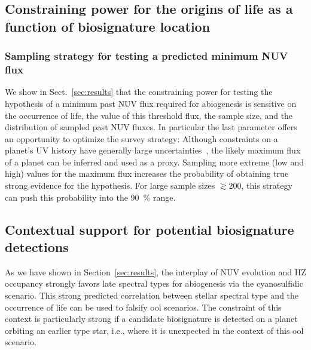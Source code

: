 \documentclass[modern,linenumbers]{aastex631}
\begin{document}
\subsection{Constraining power for the origins of life as a function of biosignature location}
\subsubsection{Sampling strategy for testing a predicted minimum \gls{NUV} flux}
We show in Sect.~\ref{sec:results} that the constraining power for testing the hypothesis of a minimum past \gls{NUV} flux required for abiogenesis is sensitive on the occurrence of life, the value of this threshold flux, the sample size, and the distribution of sampled past \gls{NUV} fluxes.
In particular the last parameter offers an opportunity to optimize the survey strategy: Although constraints on a planet's UV history have generally large uncertainties~\citep[e.g.,][]{Richey-Yowell2023}, the likely maximum flux of a planet can be inferred and used as a proxy.
Sampling more extreme (low and high) values for the maximum flux increases the probability of obtaining true strong evidence for the hypothesis.
For large sample sizes $\gtrsim 200$, this strategy can push this probability into the \SI{90}{\percent} range.




\subsection{Contextual support for potential biosignature detections}
As we have shown in Section~\ref{sec:results}, the interplay of \gls{NUV} evolution and \gls{HZ} occupancy strongly favors late spectral types for abiogenesis via the cyanosulfidic scenario.
This strong predicted correlation between stellar spectral type and the occurrence of life can be used to falsify \gls{ool} scenarios.
The constraint of this context is particularly strong if a candidate biosignature is detected on a planet orbiting an earlier type star, i.e., where it is unexpected in the context of this \gls{ool} scenario.
\end{document}
